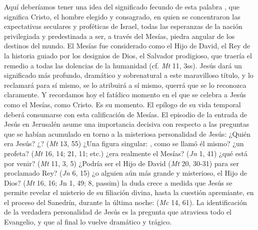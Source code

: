 \begin{body}

Aquí deberíamos tener una idea del significado fecundo de esta palabra , que significa Cristo, el hombre elegido y consagrado, en quien se concentraron las expectativas seculares y proféticas de Israel, todas las esperanzas de la nación privilegiada y predestinada a ser, a través del Mesías, piedra angular de los destinos del mundo. El Mesías fue considerado como el Hijo de David, el Rey de la historia guiado por los designios de Dios, el Salvador prodigioso, que traería el remedio a todas las dolencias de la humanidad (cf. \textit{Mt} 11, 3ss). Jesús dará un significado más profundo, dramático y sobrenatural a este maravilloso título, y lo reclamará para sí mismo, se lo atribuirá a sí mismo, querrá que se lo reconozca claramente. Y recordamos hoy el fatídico momento en el que se celebra a Jesús como el Mesías, como Cristo. Es su momento. El epílogo de su vida temporal deberá consumarse con esta calificación de Mesías. El episodio de la entrada de Jesús en Jerusalén asume una importancia decisiva con respecto a las preguntas que se habían acumulado en torno a la misteriosa personalidad de Jesús: ¿Quién era Jesús? ¿? (\textit{Mt} 13, 55) ¿Una figura singular: , como se llamó él mismo? ¿un profeta? (\textit{Mt} 16, 14; 21, 11; etc.) ¿era realmente el Mesías? (\textit{Jn} 1, 41) ¿qué está por venir? (\textit{Mt} 11, 3, 5) ¿Podría ser el Hijo de David (\textit{Mt} 20, 30-31) para ser proclamado Rey? (\textit{Jn} 6, 15) ¿o alguien aún más grande y misterioso, el Hijo de Dios? (\textit{Mt} 16, 16; Jn 1, 49; 8, passim) la duda crece a medida que Jesús se permite revelar el misterio de su filiación divina, hasta la cuestión apremiante, en el proceso del Sanedrín, durante la última noche:  (\textit{Mc} 14, 61). La identificación de la verdadera personalidad de Jesús es la pregunta que atraviesa todo el Evangelio, y que al final lo vuelve dramático y trágico.


\end{body}

